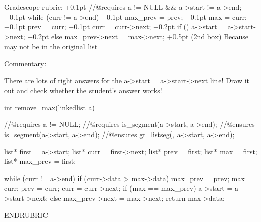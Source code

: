 Gradescope rubric:
+0.1pt  //@requires a != NULL && a->start != a->end;
+0.1pt  while (curr != a->end)
+0.1pt  max_prev = prev;
+0.1pt  max = curr;
+0.1pt  prev = curr;
+0.1pt  curr = curr->next;
+0.2pt  if () a->start = a->start->next;
+0.2pt  else max_prev->next = max->next;
+0.5pt  (2nd box) Because \result may not be in the original list

Commentary:

There are lots of right answers for the a->start = a->start->next line!
Draw it out and check whether the student's answer works!

int remove_max(linkedlist a) {
    //@requires a != NULL;
    //@requires is_segment(a->start, a->end);
    //@ensures  is_segment(a->start, a->end);
    //@ensures gt_listseg(\result, a->start, a->end);

    list* first = a->start;
    list* curr = first->next;
    list* prev = first;
    list* max = first;
    list* max_prev = first;

    while (curr != a->end) {
        if (curr->data > max->data) {
             max_prev = prev;
             max = curr;
        }
        prev = curr;
        curr = curr->next;
    }
    if (max == max_prev)
       a->start = a->start->next;
    else
       max_prev->next = max->next;
    return max->data;
}
ENDRUBRIC
